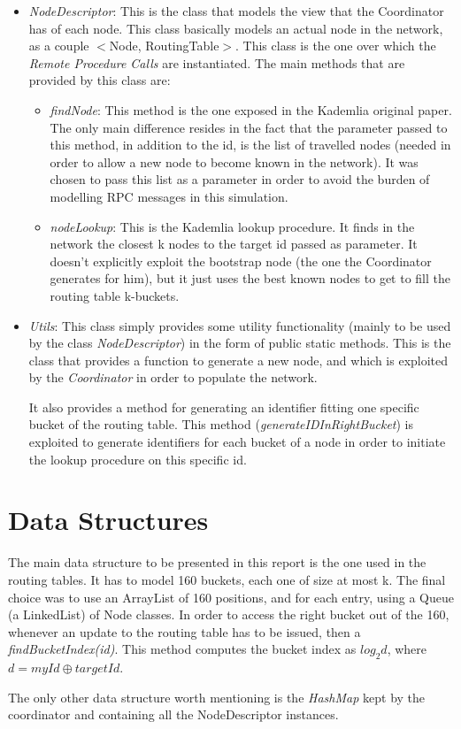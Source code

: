 \documentclass[11pt, a4paper]{report}
\begin{document}
\begin{itemize}
		\item \emph{NodeDescriptor}: This is the class that models the view that the Coordinator has of each node. This class basically models an actual node in the network, as a couple $<$Node, RoutingTable$>$. This class is the one over which the \emph{Remote Procedure Calls} are instantiated. The main methods that are provided by this class are: 
		\begin{itemize}
			\item \emph{findNode}: This method is the one exposed in the Kademlia original paper. The only main difference resides in the fact that the parameter passed to this method, in addition to the id, is the list of travelled nodes (needed in order to allow a new node to become known in the network). It was chosen to pass this list as a parameter in order to avoid the burden of modelling RPC messages in this simulation.
			\item \emph{nodeLookup}: This is the Kademlia lookup procedure. It finds in the network the closest k nodes to the target id passed as parameter. It doesn't explicitly exploit the bootstrap node (the one the Coordinator generates for him), but it just uses the best known nodes to get to fill the routing table k-buckets.
		\end{itemize}
		\item \emph{Utils}: This class simply provides some utility functionality (mainly to be used by the class \emph{NodeDescriptor}) in the form of public static methods. This is the class that provides a function to generate a new node, and which is exploited by the \emph{Coordinator} in order to populate the network.
		\par
		It also provides a method for generating an identifier fitting one specific bucket of the routing table. This method (\emph{generateIDInRightBucket}) is exploited to generate identifiers for each bucket of a node in order to initiate the lookup procedure on this specific id. 
		 
	\end{itemize}

\section*{Data Structures}
	The main data structure to be presented in this report is the one used in the routing tables. It has to model 160 buckets, each one of size at most k. The final choice was to use an ArrayList of 160 positions, and for each entry, using a Queue (a LinkedList) of Node classes. In order to access the right bucket out of the 160, whenever an update to the routing table has to be issued, then a \emph{findBucketIndex(id)}. This method computes the bucket index as $log_2 d$, where $d = myId \oplus targetId$. 
	\par 
	The only other data structure worth mentioning is the \emph{HashMap} kept by the coordinator and containing all the NodeDescriptor instances.
\end{document}
